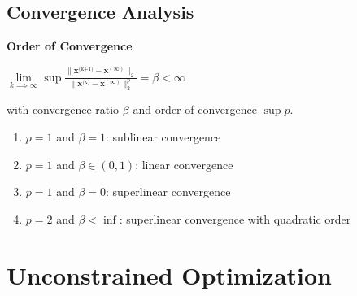 \documentclass[english]{latex4ei/latex4ei_sheet}
\begin{document}
\begin{sectionbox}
	\subsection{Convergence Analysis}
	\textbf{Order of Convergence}
	\begin{center}
		$\lim\limits_{k \implies \infty}\sup \frac{\|\bm{x}^{\text{(k+1)}} - \bm{x}^{(\infty)}  \|_2}{\| \bm{x}^{\text{(k)}} - \bm{x}^{(\infty)} \|_2^p} = \beta < \infty$
	\end{center}
	with convergence ratio $\beta$ and order of convergence $\sup p$.
	\begin{enumerate}
		\item $p=1$ and $\beta=1$: sublinear convergence
		\item $p=1$ and $\beta \in (0, 1)$: linear convergence
		\item $p=1$ and $\beta=0$: superlinear convergence
		\item $p=2$ and $\beta < \inf$: superlinear convergence with quadratic order
	\end{enumerate} 
\end{sectionbox}

\section{Unconstrained Optimization}
\end{document}
